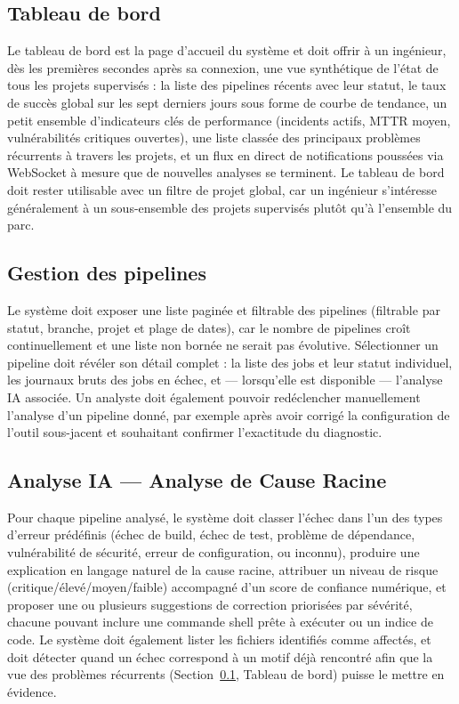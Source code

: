 \documentclass[12pt,a4paper,oneside]{report}
\begin{document}
\subsection{Tableau de bord}\label{sec:dashboardreq}
Le tableau de bord est la page d'accueil du système et doit offrir à un ingénieur, dès les premières secondes après sa connexion, une vue synthétique de l'état de tous les projets supervisés : la liste des pipelines récents avec leur statut, le taux de succès global sur les sept derniers jours sous forme de courbe de tendance, un petit ensemble d'indicateurs clés de performance (incidents actifs, MTTR moyen, vulnérabilités critiques ouvertes), une liste classée des principaux problèmes récurrents à travers les projets, et un flux en direct de notifications poussées via WebSocket à mesure que de nouvelles analyses se terminent. Le tableau de bord doit rester utilisable avec un filtre de projet global, car un ingénieur s'intéresse généralement à un sous-ensemble des projets supervisés plutôt qu'à l'ensemble du parc.

\subsection{Gestion des pipelines}
Le système doit exposer une liste paginée et filtrable des pipelines (filtrable par statut, branche, projet et plage de dates), car le nombre de pipelines croît continuellement et une liste non bornée ne serait pas évolutive. Sélectionner un pipeline doit révéler son détail complet : la liste des jobs et leur statut individuel, les journaux bruts des jobs en échec, et --- lorsqu'elle est disponible --- l'analyse IA associée. Un analyste doit également pouvoir redéclencher manuellement l'analyse d'un pipeline donné, par exemple après avoir corrigé la configuration de l'outil sous-jacent et souhaitant confirmer l'exactitude du diagnostic.

\subsection{Analyse IA --- Analyse de Cause Racine}
Pour chaque pipeline analysé, le système doit classer l'échec dans l'un des types d'erreur prédéfinis (échec de build, échec de test, problème de dépendance, vulnérabilité de sécurité, erreur de configuration, ou inconnu), produire une explication en langage naturel de la cause racine, attribuer un niveau de risque (critique/élevé/moyen/faible) accompagné d'un score de confiance numérique, et proposer une ou plusieurs suggestions de correction priorisées par sévérité, chacune pouvant inclure une commande shell prête à exécuter ou un indice de code. Le système doit également lister les fichiers identifiés comme affectés, et doit détecter quand un échec correspond à un motif déjà rencontré afin que la vue des problèmes récurrents (Section~\ref{sec:dashboardreq}, Tableau de bord) puisse le mettre en évidence.
\end{document}
